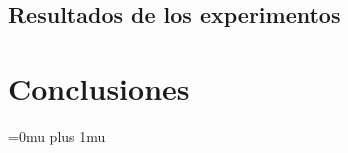\documentclass[conference]{IEEEtran}
\begin{document}
    
    
    
    \subsection{Resultados de los experimentos}
    
        
        
    




\section{Conclusiones} \label{sec:conclusiones}
    
	




\Urlmuskip=0mu plus 1mu\relax

\nocite{*}


\end{document}
